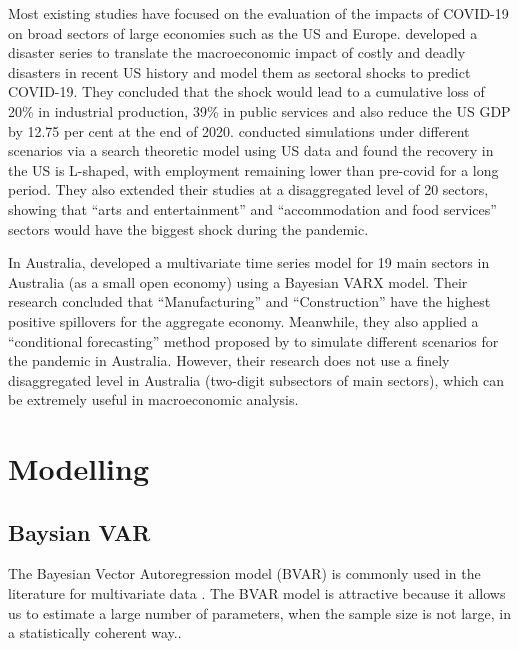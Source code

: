 \documentclass{monashthesis}
\begin{document}
Most existing studies have focused on the evaluation of the impacts of COVID-19 on broad sectors of large economies such as the US and Europe. \textcite{ludvigson2020covid} developed a disaster series to translate the macroeconomic impact of costly and deadly disasters in recent US history and model them as sectoral shocks to predict COVID-19. They concluded that the shock would lead to a cumulative loss of 20\% in industrial production, 39\% in public services and also reduce the US GDP by 12.75 per cent at the end of 2020. \textcite{gregory2020pandemic} conducted simulations under different scenarios via a search theoretic model using US data and found the recovery in the US is L-shaped, with employment remaining lower than pre-covid for a long period. They also extended their studies at a disaggregated level of 20 sectors, showing that ``arts and entertainment'' and ``accommodation and food services'' sectors would have the biggest shock during the pandemic.

In Australia, \textcite{anderson2020} developed a multivariate time series model for 19 main sectors in Australia (as a small open economy) using a Bayesian VARX model. Their research concluded that ``Manufacturing'' and ``Construction'' have the highest positive spillovers for the aggregate economy. Meanwhile, they also applied a ``conditional forecasting'' method proposed by \textcite{waggoner1999} to simulate different scenarios for the pandemic in Australia. However, their research does not use a finely disaggregated level in Australia (two-digit subsectors of main sectors), which can be extremely useful in macroeconomic analysis.

\hypertarget{modelling}{%
\section{Modelling}\label{modelling}}

\hypertarget{baysian-var}{%
\subsection{Baysian VAR}\label{baysian-var}}

The Bayesian Vector Autoregression model (BVAR) is commonly used in the literature for multivariate data \autocites[e.g.][]{anderson2020,litterman1986,banbura2010large}. The BVAR model is attractive because it allows us to estimate a large number of parameters, when the sample size is not large, in a statistically coherent way.\autocite{litterman1986,wozniak2016bayesian}.
\end{document}
